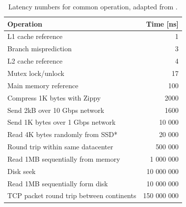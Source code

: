 \begin{table}[H]
\caption{Latency numbers for common operation, adapted from \cite{norvig_latency}.}
\label{tab:latencynumbers}
    \begin{center}
        \begin{tabular}{|l|r|}
            \hline
            \textbf{Operation}&\textbf{Time [ns]}\\
            \hline
             L1 cache reference&1\\
            \hline
             Branch misprediction&3  \\
            \hline
             L2 cache reference&4  \\
            \hline
             Mutex lock/unlock &17  \\
            \hline
             Main memory reference&100  \\
            \hline
             Compress 1K bytes with Zippy&2000  \\
            \hline
             Send 2kB over 10 Gbps network & 1600\\
            \hline
             Send 1K bytes over 1 Gbps network&10 000  \\
            \hline
             Read 4K bytes randomly from SSD* &20 000  \\
            \hline
             Round trip within same datacenter&500 000  \\
            \hline
             Read 1MB sequentially from memory&1 000 000  \\
            \hline
             Disk seek&10 000 000  \\
            \hline
             Read 1MB sequentially form disk&10 000 000  \\
            \hline
             TCP packet round trip between continents&150 000 000  \\
            \hline
        \end{tabular}
    \end{center}
\end{table}
